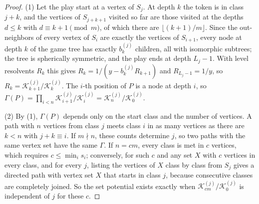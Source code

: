 \documentclass[final]{siamart0516}
\numberwithin{theorem}{section}
\numberwithin{equation}{section}
\theoremstyle{siamnonum}
\theoremstyle{plain}
\newcommand{\cont}{\mathcal{K}}           %
\begin{document}
\begin{proof}
(1) Let the play start at a vertex of $S_j$. At depth $k$ the token is in class $j+k$, and the vertices of $S_{j+k+1}$ visited so far are those visited at the depths $d\le k$ with $d\equiv k+1\pmod m$, of which there are $\lfloor(k+1)/m\rfloor$. Since the out-neighbors of every vertex of $S_i$ are exactly the vertices of $S_{i+1}$, every node at depth $k$ of the game tree has exactly $b^{(j)}_k$ children, all with isomorphic subtrees; the tree is spherically symmetric, and the play ends at depth $L_j-1$. With level resolvents $R_k$ this gives $R_k=1/(y-b^{(j)}_kR_{k+1})$ and $R_{L_j-1}=1/y$, so $R_k=\cont^{(j)}_{k+1}/\cont^{(j)}_k$. The $i$-th position of $P$ is a node at depth $i$, so $\Gamma(P)=\prod_{i<n}\cont^{(j)}_{i+1}/\cont^{(j)}_i=\cont^{(j)}_n/\cont^{(j)}_0$.

(2) By (1), $\Gamma(P)$ depends only on the start class and the number of vertices. A path with $n$ vertices from class $j$ meets class $i$ in as many vertices as there are $k<n$ with $j+k\equiv i$. If $m\nmid n$, these counts determine $j$, so two paths with the same vertex set have the same $\Gamma$. If $n=cm$, every class is met in $c$ vertices, which requires $c\le\min_is_i$; conversely, for such $c$ and any set $X$ with $c$ vertices in every class, and for every $j$, listing the vertices of $X$ class by class from $S_j$ gives a directed path with vertex set $X$ that starts in class $j$, because consecutive classes are completely joined. So the set potential exists exactly when $\cont^{(j)}_{cm}/\cont^{(j)}_0$ is independent of $j$ for these $c$.
\end{proof}
\end{document}
